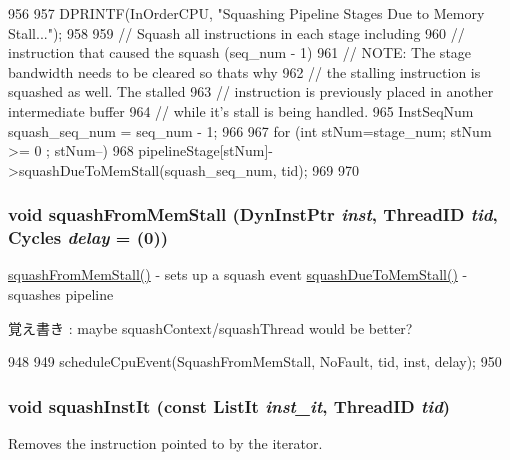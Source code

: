 \begin{DoxyCode}
956 {
957     DPRINTF(InOrderCPU, "Squashing Pipeline Stages Due to Memory Stall...\n");
958         
959     // Squash all instructions in each stage including 
960     // instruction that caused the squash (seq_num - 1)
961     // NOTE: The stage bandwidth needs to be cleared so thats why
962     //       the stalling instruction is squashed as well. The stalled
963     //       instruction is previously placed in another intermediate buffer
964     //       while it's stall is being handled.
965     InstSeqNum squash_seq_num = seq_num - 1;
966     
967     for (int stNum=stage_num; stNum >= 0 ; stNum--) {
968         pipelineStage[stNum]->squashDueToMemStall(squash_seq_num, tid);
969     }
970 }
\end{DoxyCode}
\hypertarget{classInOrderCPU_a3b9652a69ff2d5c02c1b696c1007ac9d}{
\subsubsection[{squashFromMemStall}]{\setlength{\rightskip}{0pt plus 5cm}void squashFromMemStall ({\bf DynInstPtr} {\em inst}, \/  {\bf ThreadID} {\em tid}, \/  {\bf Cycles} {\em delay} = {(0)})}}
\label{classInOrderCPU_a3b9652a69ff2d5c02c1b696c1007ac9d}
\hyperlink{classInOrderCPU_a3b9652a69ff2d5c02c1b696c1007ac9d}{squashFromMemStall()} -\/ sets up a squash event \hyperlink{classInOrderCPU_a302751e3ba3d567b01c7446f9227a2da}{squashDueToMemStall()} -\/ squashes pipeline \begin{DoxyNote}{覚え書き}
: maybe squashContext/squashThread would be better? 
\end{DoxyNote}



\begin{DoxyCode}
948 {
949     scheduleCpuEvent(SquashFromMemStall, NoFault, tid, inst, delay);
950 }
\end{DoxyCode}
\hypertarget{classInOrderCPU_a7a98b3e8dc082558dcf225e49588c70a}{
\subsubsection[{squashInstIt}]{\setlength{\rightskip}{0pt plus 5cm}void squashInstIt (const {\bf ListIt} {\em inst\_\-it}, \/  {\bf ThreadID} {\em tid})}}
\label{classInOrderCPU_a7a98b3e8dc082558dcf225e49588c70a}
Removes the instruction pointed to by the iterator. 


